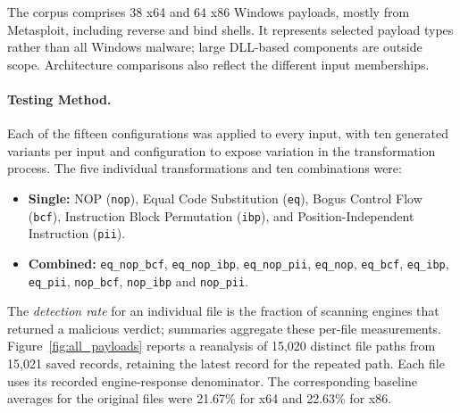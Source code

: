 \documentclass[runningheads]{llncs}
\begin{document}
The corpus comprises 38 x64 and 64 x86 Windows payloads, mostly from
Metasploit, including reverse and bind shells. It represents selected
payload types rather than all Windows malware; large DLL-based components
are outside scope. Architecture comparisons also reflect the different
input memberships.

\paragraph{Testing Method.}
Each of the fifteen configurations was applied to every input, with ten generated variants per input and configuration to expose variation in the transformation process. The five individual transformations and ten combinations were:

\begin{itemize}
    \item \textbf{Single:} NOP (\texttt{nop}), Equal Code Substitution (\texttt{eq}), Bogus Control Flow (\texttt{bcf}), Instruction Block Permutation (\texttt{ibp}), and Position-Independent Instruction (\texttt{pii}).
    \item \textbf{Combined:} \texttt{eq\_nop\_bcf}, \texttt{eq\_nop\_ibp}, \texttt{eq\_nop\_pii}, \texttt{eq\_nop}, \texttt{eq\_bcf}, \texttt{eq\_ibp}, \texttt{eq\_pii}, \texttt{nop\_bcf}, \texttt{nop\_ibp} and \texttt{nop\_pii}.
\end{itemize}

The \emph{detection rate} for an individual file is the fraction of scanning engines that returned a malicious verdict; summaries aggregate these per-file measurements. Figure~\ref{fig:all_payloads} reports a reanalysis of 15,020 distinct
file paths from 15,021 saved records, retaining the latest record for the
repeated path. Each file uses its recorded engine-response denominator. The corresponding baseline averages for the original files were 21.67\% for x64 and 22.63\% for x86.
\end{document}

